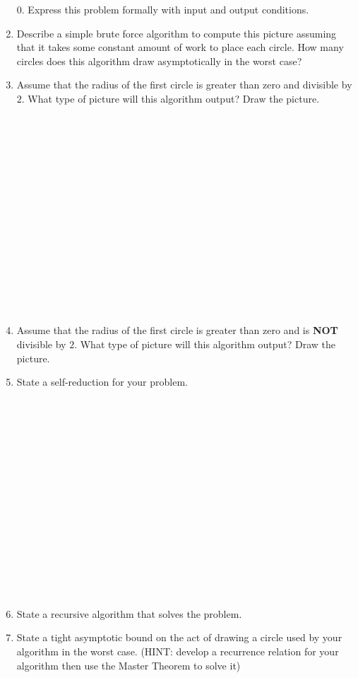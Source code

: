\documentclass[12pt]{article}
\begin{document}
\begin{enumerate}
\item[0.]  Express this problem formally with input and output conditions.
\newpage
\item Describe a simple brute force algorithm to compute this picture assuming that it takes 
some constant amount of work to place each circle. How many circles does this algorithm draw asymptotically in 
the worst case?
\newpage
\item Assume that the radius of the first circle is greater than zero and divisible by $2$.
What type of picture will this algorithm output? Draw the picture.\\\\\\\\\\\\\\\\\\\\\\\\\\\\\\\\
\item Assume that the radius of the first circle is greater than zero and is \textbf{NOT} divisible by $2$.
What type of picture will this algorithm output? Draw the picture.
\newpage 
\item State a self-reduction for your problem.\\\\\\\\\\\\\\\\\\\\\\\\\\\\\\\\
\item State a recursive algorithm that solves the problem.
\newpage
\item State a tight asymptotic bound on the act of drawing a circle used by your algorithm in the worst case.
(HINT: develop a recurrence relation for your algorithm then use the Master Theorem to solve it)

\end{enumerate}
\end{document}

